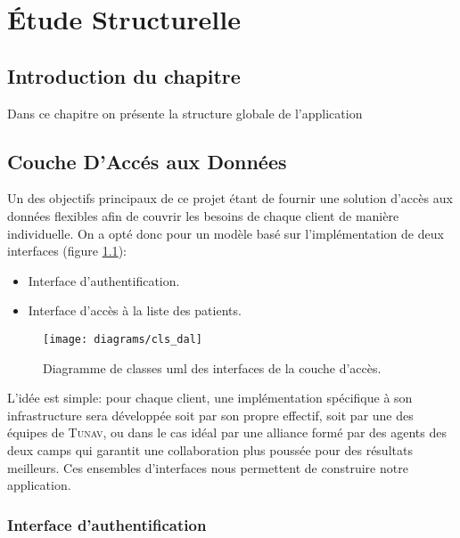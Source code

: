 
\chapter{Étude Structurelle}

\section{Introduction du chapitre}

Dans ce chapitre on présente la structure globale de l'application

\section[Couche d'Accès aux Données]{Couche D'Accés aux Données}

Un des objectifs principaux de ce projet étant de fournir une solution
d’accès aux données flexibles afin de couvrir les besoins de chaque
client de manière individuelle. On a opté donc pour un modèle basé sur
l’implémentation de deux interfaces (figure \ref{fig:cls_dal}):

\begin{itemize}

\item Interface d'authentification.

\item Interface d’accès à la liste des patients.

\end{itemize}

\begin{figure}
\center
\texttt{[image: diagrams/cls\_dal]}
\caption{Diagramme de classes \gls{uml} des interfaces de la couche d’accès.}
\label{fig:cls_dal}
\end{figure}

L'idée est simple: pour chaque client, une implémentation spécifique à son infrastructure sera développée soit par son propre effectif, soit par une des équipes de \textsc{Tunav}, ou dans le cas idéal par une alliance formé par des agents des deux camps qui garantit une collaboration plus poussée pour des résultats meilleurs.
Ces ensembles d'interfaces nous permettent de construire notre application.

\subsection{Interface d'authentification}

